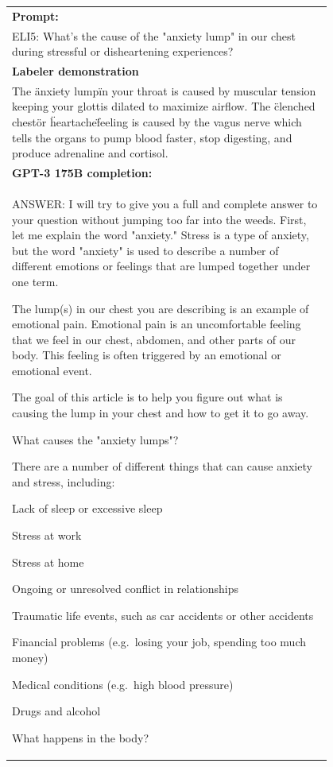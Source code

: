 \documentclass{article}
\begin{document}
\begin{figure}[hp]
    \centering
    \small
    \begin{tabular}{p{0.95\linewidth}}
    \toprule 
        \textbf{Prompt:}   \\
       ELI5: What's the cause of the "anxiety lump" in our chest during stressful or disheartening experiences?
         \\ \midrule
\textbf{Labeler demonstration}\\ 
The \"anxiety lump\" in your throat is caused by muscular tension keeping your glottis dilated to maximize airflow. The \"clenched chest\" or \"heartache\" feeling is caused by the vagus nerve which tells the organs to pump blood faster, stop digesting, and produce adrenaline and cortisol.
\\ \midrule 
        \textbf{GPT-3 175B completion:} \\
        ANSWER: I will try to give you a full and complete answer to your question without jumping too far into the weeds. First, let me explain the word "anxiety." Stress is a type of anxiety, but the word "anxiety" is used to describe a number of different emotions or feelings that are lumped together under one term.

The lump(s) in our chest you are describing is an example of emotional pain. Emotional pain is an uncomfortable feeling that we feel in our chest, abdomen, and other parts of our body. This feeling is often triggered by an emotional or emotional event.

The goal of this article is to help you figure out what is causing the lump in your chest and how to get it to go away.

What causes the "anxiety lumps"?

There are a number of different things that can cause anxiety and stress, including:

Lack of sleep or excessive sleep

Stress at work

Stress at home

Ongoing or unresolved conflict in relationships

Traumatic life events, such as car accidents or other accidents

Financial problems (e.g.\ losing your job, spending too much money)

Medical conditions (e.g.\ high blood pressure)

Drugs and alcohol

What happens in the body?


\end{tabular}
\end{figure}
\end{document}
